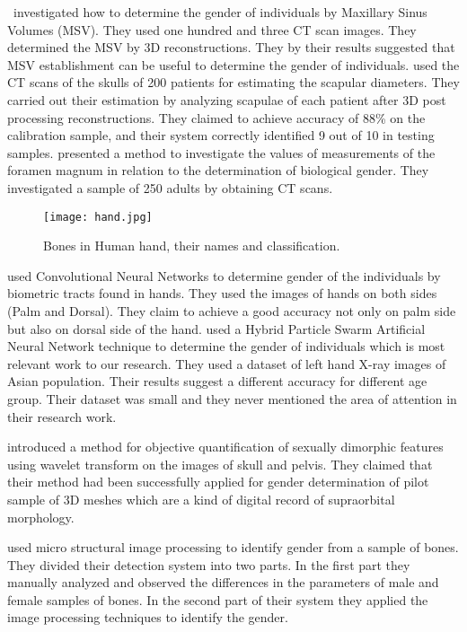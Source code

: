 \documentclass{bioinfo}
\begin{document}
\citep{thomas18}~investigated how to determine the gender of individuals by Maxillary Sinus Volumes (MSV). They used one hundred and three CT scan images. They determined the MSV by 3D reconstructions. They by their results suggested that MSV establishment can be useful to determine the gender of individuals.
 \citep{fgiu13} used the CT scans of the skulls of 200 patients for estimating the scapular diameters. They carried out their estimation by analyzing scapulae of each patient after 3D post processing reconstructions. They claimed to achieve accuracy of 88\% on the calibration sample, and their system correctly identified 9 out of 10 in testing samples.
 \citep{edwards13} presented a method to investigate the values of measurements of the foramen magnum in relation to the determination of biological gender. They investigated a sample of 250 adults by obtaining CT scans.
 \begin{figure}[H]%
\texttt{[image: hand.jpg]}
\caption{Bones in Human hand, their names and classification.}
\label{fig:hand}
\end{figure}
 
 \citep{afifi17} used Convolutional Neural Networks to determine gender of the individuals by biometric tracts found in hands. They used the images of hands on both sides (Palm and Dorsal). They claim to achieve a good accuracy not only on palm side but also on dorsal side of the hand.
\citep{mfdar15} used a Hybrid Particle Swarm Artificial Neural Network technique to determine the gender of individuals which is most relevant work to our research. They used a dataset of left hand X-ray images of Asian population. Their results suggest a different accuracy for different age group. Their dataset was small and they never mentioned the area of attention in their research work. 

\citep{scdpin16} introduced a method for objective quantification of sexually dimorphic features using wavelet transform on the images of skull and pelvis. They claimed that their method had been successfully applied for gender determination of pilot sample of 3D meshes which are a kind of digital record of supraorbital morphology. 

\citep{habdul17} used micro structural image processing to identify gender from a sample of bones. They divided their detection system into two parts. In the first part they manually analyzed and observed the differences in the parameters of male and female samples of bones. In the second part of their system they applied the image processing techniques to identify the gender.
\end{document}
